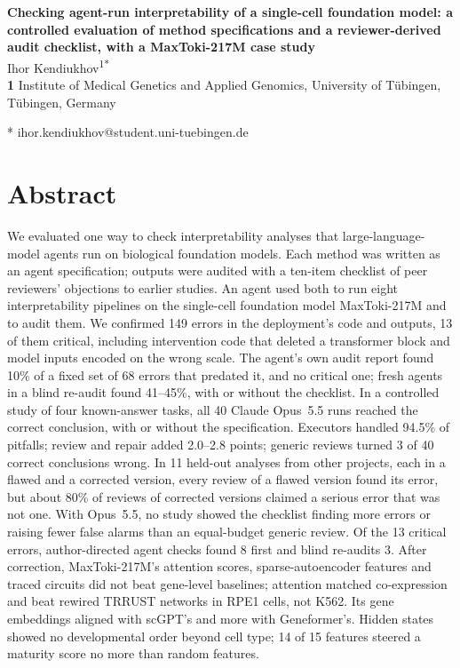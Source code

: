 
\vspace*{0.2in}

\begin{flushleft}
{\Large
\textbf{Checking agent-run interpretability of a single-cell foundation model: a controlled evaluation of method specifications and a reviewer-derived audit checklist, with a MaxToki-217M case study}
}
\newline
\\
Ihor Kendiukhov\textsuperscript{1*}
\\
\bigskip
\textbf{1} Institute of Medical Genetics and Applied Genomics, University of T\"ubingen, T\"ubingen, Germany
\\
\bigskip

* ihor.kendiukhov@student.uni-tuebingen.de

\end{flushleft}

\section*{Abstract}
We evaluated one way to check interpretability analyses that
large-language-model agents run on biological foundation models. Each
method was written as an agent specification; outputs were audited with
a ten-item checklist of peer reviewers' objections to earlier studies.
An agent used both to run eight interpretability pipelines on the
single-cell foundation model MaxToki-217M and to audit them. We confirmed 149 errors in the deployment's code and outputs, 13
of them critical, including intervention code that deleted a transformer
block and model inputs encoded on the wrong scale. The agent's own audit report found 10\% of a fixed set of 68
errors that predated it, and no critical one; fresh agents in a blind re-audit found 41--45\%, with or
without the checklist. In a controlled study of four known-answer tasks,
all 40 Claude Opus~5.5 runs reached the correct conclusion, with or
without the specification. Executors handled 94.5\% of pitfalls; review and repair added 2.0--2.8 points; generic reviews
turned 3 of 40 correct conclusions wrong. In 11 held-out analyses from
other projects, each in a flawed and a corrected version, every review
of a flawed version found its error, but about 80\% of
reviews of corrected versions claimed a serious error that was not one.
With Opus~5.5, no study showed the checklist finding more errors or
raising fewer false alarms than an equal-budget generic review. Of the 13 critical errors, author-directed agent checks found 8 first and
blind re-audits 3. After correction, MaxToki-217M's attention scores,
sparse-autoencoder features and traced circuits did not beat gene-level
baselines; attention matched co-expression and beat rewired TRRUST
networks in RPE1 cells, not K562. Its gene embeddings aligned with
scGPT's and more with Geneformer's. Hidden states showed no
developmental order beyond cell type; 14 of 15 features steered a maturity score no more than random features.

\clearpage
{}
\fancyheadoffset[L]{0pt}
\fancyfootoffset[L]{0pt}
\linenumbers
